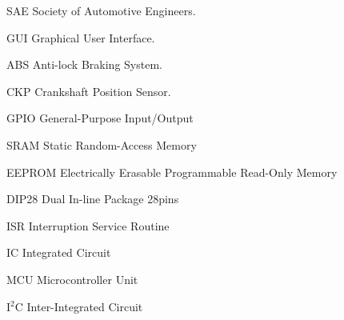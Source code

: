 \begin{siglas}
  \item[SAE] Society of Automotive Engineers.
  \item[GUI] Graphical User Interface.
  \item[ABS] Anti-lock Braking System.
  \item[CKP] Crankshaft Position Sensor.
  \item[GPIO] General-Purpose Input/Output
  \item[SRAM] Static Random-Access Memory
  \item[EEPROM] Electrically Erasable Programmable Read-Only Memory
  \item[DIP28] Dual In-line Package 28pins
  \item[ISR] Interruption Service Routine
  \item[IC] Integrated Circuit
  \item[MCU] Microcontroller Unit
  \item[I$^2$C] Inter-Integrated Circuit
\end{siglas}
